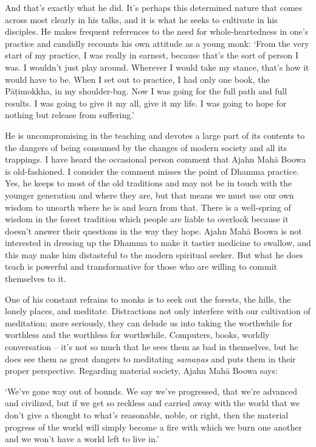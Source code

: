 And that's exactly what he did. It's perhaps this determined nature that
comes across most clearly in his talks, and it is what he seeks to
cultivate in his disciples. He makes frequent references to the need for
whole-heartedness in one's practice and candidly recounts his own
attitude as a young monk: `From the very start of my practice, I was
really in earnest, because that's the sort of person I was. I wouldn't
just play around. Wherever I would take my stance, that's how it would
have to be. When I set out to practice, I had only one book, the
Pāṭimokkha, in my shoulder-bag. Now I was going for the full path and
full results. I was going to give it my all, give it my life. I was
going to hope for nothing but release from suffering.'

He is uncompromising in the teaching and devotes a large part of its
contents to the dangers of being consumed by the changes of modern
society and all its trappings. I have heard the occasional person
comment that Ajahn Mahā Boowa is old-fashioned. I consider the comment
misses the point of Dhamma practice. Yes, he keeps to most of the old
traditions and may not be in touch with the younger generation and where
they are, but that means we must use our own wisdom to unearth where he
is and learn from that. There is a well-spring of wisdom in the forest
tradition which people are liable to overlook because it doesn't answer
their questions in the way they hope. Ajahn Mahā Boowa is not interested
in dressing up the Dhamma to make it tastier medicine to swallow, and
this may make him distasteful to the modern spiritual seeker. But what
he does teach is powerful and transformative for those who are willing
to commit themselves to it. 

One of his constant refrains to monks is to seek out the forests, the
hills, the lonely places, and meditate. Distractions not only interfere
with our cultivation of meditation; more seriously, they can delude us
into taking the worthwhile for worthless and the worthless for
worthwhile. Computers, books, worldly conversation -- it's not so much
that he sees them as bad in themselves, but he does see them as great
dangers to meditating \emph{samaṇas} and puts them in their proper
perspective. Regarding material society, Ajahn Mahā Boowa says: 

`We've gone way out of bounds. We say we've progressed, that we're
advanced and civilized, but if we get so reckless and carried away with
the world that we don't give a thought to what's reasonable, noble, or
right, then the material progress of the world will simply become a fire
with which we burn one another and we won't have a world left to live
in.'

